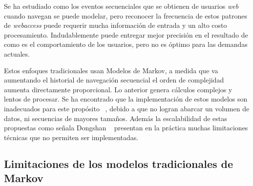 
%
 


Se ha estudiado como los eventos secuenciales que se obtienen de usuarios \emph{web} cuando navegan se puede modelar, pero reconocer la frecuencia de estos patrones de \emph{webaccess} puede requerir mucha  información de entrada y un alto costo procesamiento.  Indudablemente puede entregar mejor precisión en el resultado de como es el comportamiento de los usuarios, pero no es óptimo para las demandas actuales. 

Estos enfoques tradicionales usan Modelos de Markov, a medida que va aumentando el historial de navegación secuencial el orden de complejidad aumenta directamente proporcional. Lo anterior genera cálculos  complejos y lentos de procesar. Se ha encontrado que la implementación de estos modelos son inadecuados para este propósito~\cite{Dongshan2002} , debido a que no logran abarcar un volumen de datos, ni secuencias de mayores tamaños. Además la escalabilidad de estas propuestas  como señala Dongshan \etal~\cite{Dongshan2002} presentan en la práctica muchas limitaciones técnicas que no permiten ser implementadas. 


 








\subsection{Limitaciones de los modelos tradicionales de Markov}





